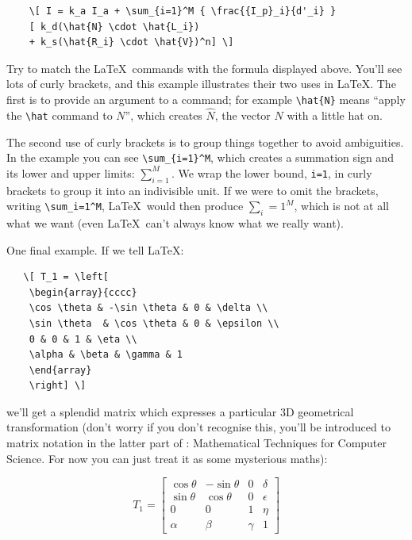 \begin{refsection}
\begin{verbatim}
    \[ I = k_a I_a + \sum_{i=1}^M { \frac{{I_p}_i}{d'_i} }
    [ k_d(\hat{N} \cdot \hat{L_i}) 
    + k_s(\hat{R_i} \cdot \hat{V})^n] \]
\end{verbatim}
%
Try to match the \LaTeX\ commands with the formula displayed above. You'll see lots of curly brackets, and this example illustrates their two uses in \LaTeX. The first is to provide an argument to a command; for example \verb|\hat{N}| means ``apply the \verb|\hat| command to $N$'', which creates \(\hat{N}\), the vector \( N \) with a little hat  on.  

The second use of curly brackets is to group things together to avoid ambiguities. In the example you can see \verb|\sum_{i=1}^M|, which creates a summation sign and its lower and upper limits: \( \sum_{i=1}^{M} \). We wrap the lower bound, \verb|i=1|, in curly brackets to group it into an indivisible unit. If we were to omit the brackets, writing \verb|\sum_i=1^M|, \LaTeX\ would then produce \( \sum_i=1^M \), which is not at all what we want (even \LaTeX\ can't always know what we really want).

One final example. If we tell \LaTeX:

\begin{verbatim}
   \[ T_1 = \left[
    \begin{array}{cccc}
    \cos \theta & -\sin \theta & 0 & \delta \\
    \sin \theta  & \cos \theta & 0 & \epsilon \\
    0 & 0 & 1 & \eta \\
    \alpha & \beta & \gamma & 1
    \end{array}
    \right] \]
\end{verbatim}
%
we'll get a splendid matrix which expresses a particular 3D geometrical transformation (don't worry if you don't recognise this, you'll be introduced to matrix notation in the latter part of : Mathematical Techniques for Computer Science. For now you can just treat it as some mysterious maths):

\[   T_1 = \left[
    \begin{array}{cccc}
    \cos \theta & -\sin \theta & 0 & \delta \\
    \sin \theta  & \cos \theta & 0 & \epsilon \\
    0 & 0 & 1 & \eta \\
    \alpha & \beta & \gamma & 1
    \end{array}
    \right]
\]
%


\end{refsection}
